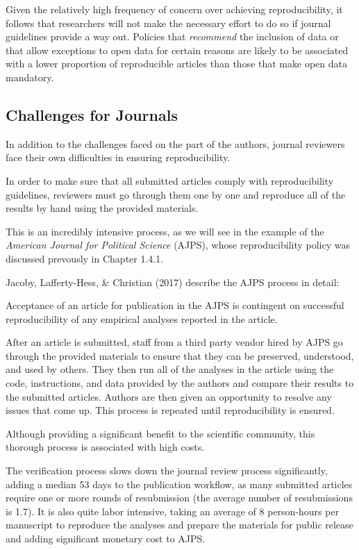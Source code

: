 \documentclass[12pt,twoside]{reedthesis}
\begin{document}
Given the relatively high frequency of concern over achieving
reproducibility, it follows that researchers will not make the necessary
effort to do so if journal guidelines provide a way out. Policies that
\emph{recommend} the inclusion of data or that allow exceptions to open
data for certain reasons are likely to be associated with a lower
proportion of reproducible articles than those that make open data
mandatory.

\subsection{Challenges for Journals}\label{challenges-for-journals}

In addition to the challenges faced on the part of the authors, journal
reviewers face their own difficulties in ensuring reproducibility.

In order to make sure that all submitted articles comply with
reproducibility guidelines, reviewers must go through them one by one
and reproduce all of the results by hand using the provided materials.

This is an incredibly intensive process, as we will see in the example
of the \emph{American Journal for Political Science} (AJPS), whose
reproducibility policy was discussed prevously in Chapter 1.4.1.

Jacoby, Lafferty-Hess, \& Christian (2017) describe the AJPS process in
detail:

Acceptance of an article for publication in the AJPS is contingent on
successful reproducibility of any empirical analyses reported in the
article.

After an article is submitted, staff from a third party vendor hired by
AJPS go through the provided materials to ensure that they can be
preserved, understood, and used by others. They then run all of the
analyses in the article using the code, instructions, and data provided
by the authors and compare their results to the submitted articles.
Authors are then given an opportunity to resolve any issues that come
up. This process is repeated until reproducibility is ensured.

Although providing a significant benefit to the scientific community,
this thorough process is associated with high costs.

The verification process slows down the journal review process
significantly, adding a median 53 days to the publication workflow, as
many submitted articles require one or more rounds of resubmission (the
average number of resubmissions is 1.7). It is also quite labor
intensive, taking an average of 8 person-hours per manuscript to
reproduce the analyses and prepare the materials for public release and
adding significant monetary cost to AJPS.
\end{document}
